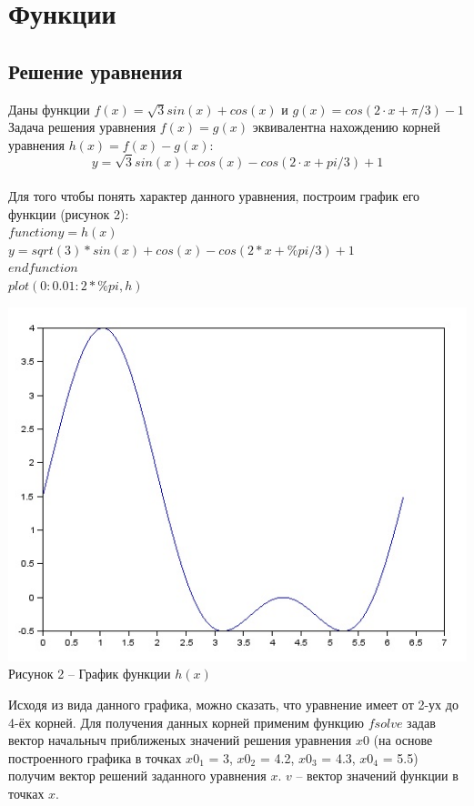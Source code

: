 \documentclass[russian, utf8, nocolumnxxxi, nocolumnxxxii, 14pt]{eskdtext}
\begin{document}
\section{Функции}
\subsection{Решение уравнения}
Даны функции $f(x) = \sqrt{3}sin(x) + cos(x)$ и $g(x) = cos(2 \cdot x + \pi/3) - 1$ \\
\indent Задача решения уравнения $f(x) = g(x)$ эквивалентна нахождению корней уравнения $h(x) = f(x) - g(x)$:\\
$$y = \sqrt{3}sin(x) + cos(x) - cos(2 \cdot x + pi/3) + 1$$ \\
\indent Для того чтобы понять характер данного уравнения, построим график его функции (рисунок 2):\\
$function y = h(x)$ \\
$y = sqrt(3) * sin(x) + cos(x) - cos(2*x + \%pi/3) + 1$ \\
$endfunction$ \\
$plot(0:0.01:2*\%pi,h)$ \\
\begin{center} 
\includegraphics[scale=0.8]{JPG/zwei.jpg}\\
Рисунок 2 -- График функции $h(x)$\\
\end{center}
\indent Исходя из вида данного графика, можно сказать, что уравнение имеет от 2-ух до 4-ёх корней. Для получения данных корней применим функцию $fsolve$ задав вектор начальныч приближеных значений решения уравнения $x0$ (на основе построенного графика в точках $x0_1$ = 3, $x0_2$ = 4.2, $x0_3$ = 4.3, $x0_4$ = 5.5) получим вектор решений заданного уравнения $x$. $v$ -- вектор значений функции в точках $x$. \\
\end{document}
